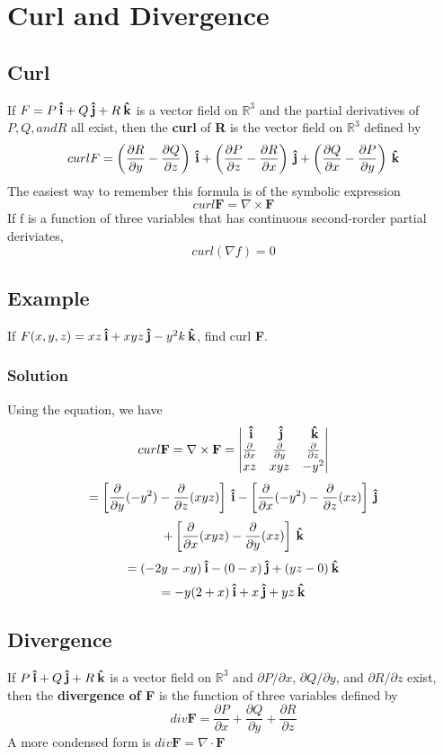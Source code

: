 \section{Curl and Divergence}
\subsection*{Curl}
If $F = P\:\boldsymbol{\hat{\textbf{i}}} + Q\:\boldsymbol{\hat{\textbf{j}}} + R\:\boldsymbol{\hat{\textbf{k}}}$ is a vector field on $\mathbb{R}^3$ and the partial derivatives of $P, Q, and R$ all exist, then the \textbf{curl} of \textbf{R} is the vector field on $\mathbb{R}^3$ defined by 
$$curl F = \left(\frac{\partial R}{\partial y} - \frac{\partial Q}{\partial z}\right)\:\boldsymbol{\hat{\textbf{i}}} + \left(\frac{\partial P}{\partial z} - \frac{\partial R}{\partial x}\right)\:\boldsymbol{\hat{\textbf{j}}} + \left(\frac{\partial Q}{\partial x} - \frac{\partial P}{\partial y}\right)\:\boldsymbol{\hat{\textbf{k}}}$$
The easiest way to remember this formula is of the symbolic expression $$curl \textbf{F} = \nabla\times\textbf{F}$$
If f is a function of three variables that has continuous second-rorder partial deriviates, $$curl(\nabla f) = 0$$
\subsection*{Example}
If $F(x,y,z) = xz\:\boldsymbol{\hat{\textbf{i}}} + xyz\:\boldsymbol{\hat{\textbf{j}}} - y^2k\:\boldsymbol{\hat{\textbf{k}}}$, find curl \textbf{F}.
\subsubsection*{Solution} Using the equation, we have
$$curl\textbf{F} = \nabla\times\textbf{F} = \begin{vmatrix}
    \:\boldsymbol{\hat{\textbf{i}}}&\:\boldsymbol{\hat{\textbf{j}}}&\:\boldsymbol{\hat{\textbf{k}}}\\
    \frac{\partial}{\partial x}&\frac{\partial}{\partial y}&\frac{\partial}{\partial z}\\
    xz&xyz&-y^2
\end{vmatrix}$$
$$= \left[\frac{\partial}{\partial y}(-y^2) - \frac{\partial}{\partial z}(xyz)\right]\:\boldsymbol{\hat{\textbf{i}}} - \left[\frac{\partial}{\partial x}(-y^2) - \frac{\partial}{\partial z}(xz)\right]\:\boldsymbol{\hat{\textbf{j}}}$$
$$+ \left[\frac{\partial}{\partial x}(xyz) - \frac{\partial}{\partial y}(xz)\right]\:\boldsymbol{\hat{\textbf{k}}}$$ $$= (-2y - xy)\:\boldsymbol{\hat{\textbf{i}}} - (0 - x)\:\boldsymbol{\hat{\textbf{j}}} + (yz - 0)\:\boldsymbol{\hat{\textbf{k}}}$$
$$= -y(2 + x)\:\boldsymbol{\hat{\textbf{i}}} + x\:\boldsymbol{\hat{\textbf{j}}} + yz\:\boldsymbol{\hat{\textbf{k}}}$$

\subsection*{Divergence}
If $P\:\boldsymbol{\hat{\textbf{i}}} + Q\:\boldsymbol{\hat{\textbf{j}}} + R\:\boldsymbol{\hat{\textbf{k}}}$ is a vector field on $\mathbb{R}^3$ and $\partial P/\partial x$, $\partial Q/\partial y$, and $\partial R/\partial z$ exist, then the \textbf{divergence of F} is the function of three variables defined by
$$div \textbf{F} = \frac{\partial P}{\partial x} + \frac{\partial Q}{\partial y} + \frac{\partial R}{\partial z}$$
A more condensed form is $div \textbf{F} = \nabla\cdot\textbf{F}$
